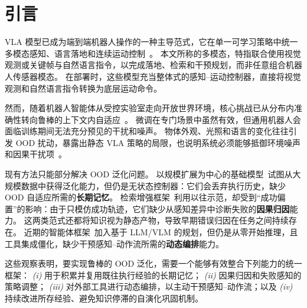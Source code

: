 \section{引言}
\renewcommand{\thefootnote}{\fnsymbol{footnote}}

\renewcommand{\thefootnote}{\arabic{footnote}}

VLA 模型已成为端到端机器人操作的一种主导范式，它在单一可学习策略中统一多模态感知、语言落地和连续运动控制~\cite{VLA_review1, VLA_review2}。
本文所称的多模态，特指联合使用视觉观测或关键帧与自然语言指令，以完成落地、检索和干预规划，而非任意组合机器人传感器模态。
在部署时，这些模型充当整体式的感知--运动控制器，直接将视觉观测和自然语言指令转换为底层运动命令。

然而，随着机器人智能体从受控实验室走向开放世界环境，核心挑战已从分布内准确性转向鲁棒的上下文内自适应~\cite{Yuan2025FromST}。
微调在专门场景中虽然有效，但通用机器人会面临训练期间无法充分预见的干扰和噪声。
物体外观、光照和语言的变化往往引发 OOD 扰动，暴露出静态 VLA 策略的局限，也说明系统必须能够抵御环境噪声和因果干扰项~\cite{RT-2, hill2020humaninstructionfollowingdeepreinforcement, pmlr-v205-shah23b, liberopro,LIBERO-Plus}。

现有方法只能部分解决 OOD 泛化问题。
以规模扩展为中心的基础模型~\cite{pi0, openvla, openx}试图从大规模数据中获得泛化能力，但仍是无状态控制器：它们会丢弃执行历史，缺少 OOD 自适应所需的\textbf{长期记忆}。
检索增强框架~\cite{ricl, memer}利用以往示范，却受到“成功偏置”的影响：由于只模仿成功轨迹，它们缺少从感知差异中诊断失败的\textbf{因果归因}能力。
这两类范式还都将知识视为静态产物，导致早期错误归因在任务之间持续存在。
近期的智能体框架~\cite{cap, voxposer, moka}加入基于 LLM/VLM 的规划，但仍是从零开始推理，且工具集成僵化，缺少干预感知--动作流所需的\textbf{动态编排}能力。

这些观察表明，要实现鲁棒的 OOD 泛化，需要一个能够有效整合下列能力的统一框架：
\emph{(i)} 用于积累并复用既往执行经验的长期记忆；
\emph{(ii)} 因果归因和失败感知的策略调整；
\emph{(iii)} 对外部工具进行动态编排，以主动干预感知--动作流；以及
\emph{(iv)} 持续改进所存经验、避免知识停滞的自演化巩固机制。

